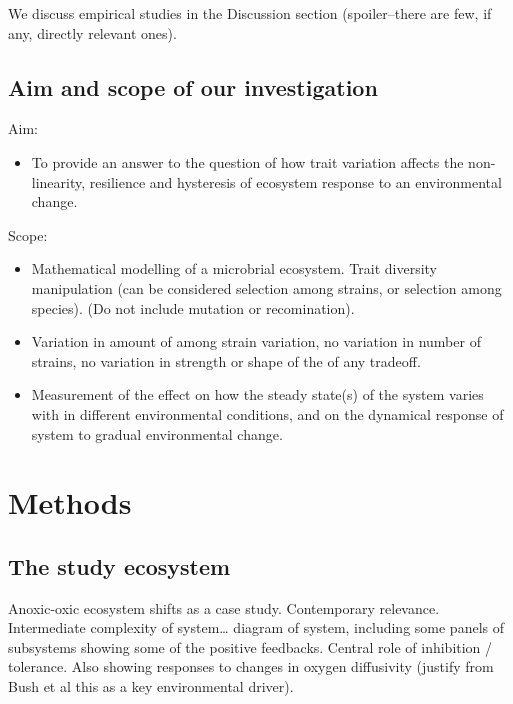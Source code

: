 \documentclass{article}
\begin{document}
We discuss empirical studies in the Discussion section (spoiler--there
are few, if any, directly relevant ones).

\hypertarget{aim-and-scope-of-our-investigation}{%
\subsection{Aim and scope of our
investigation}\label{aim-and-scope-of-our-investigation}}

Aim:

\begin{itemize}
\tightlist
\item
  To provide an answer to the question of how trait variation affects
  the non-linearity, resilience and hysteresis of ecosystem response to
  an environmental change.
\end{itemize}

Scope:

\begin{itemize}
\item
  Mathematical modelling of a microbrial ecosystem. Trait diversity
  manipulation (can be considered selection among strains, or selection
  among species). (Do not include mutation or recomination).
\item
  Variation in amount of among strain variation, no variation in number
  of strains, no variation in strength or shape of the of any tradeoff.
\item
  Measurement of the effect on how the steady state(s) of the system
  varies with in different environmental conditions, and on the
  dynamical response of system to gradual environmental change.
\end{itemize}

\hypertarget{methods}{%
\section{Methods}\label{methods}}

\hypertarget{the-study-ecosystem}{%
\subsection{The study ecosystem}\label{the-study-ecosystem}}

Anoxic-oxic ecosystem shifts as a case study. Contemporary relevance.
Intermediate complexity of system\ldots{} diagram of system, including
some panels of subsystems showing some of the positive feedbacks.
Central role of inhibition / tolerance. Also showing responses to
changes in oxygen diffusivity (justify from Bush et al this as a key
environmental driver).
\end{document}
